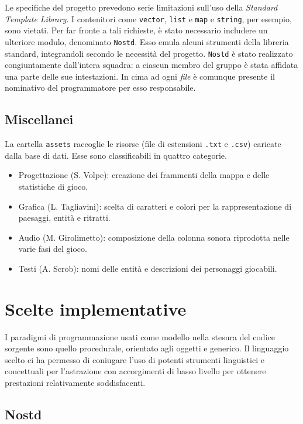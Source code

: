 \documentclass[a4paper]{article}
\begin{document}
Le specifiche del progetto prevedono serie limitazioni sull'uso della
\emph{Standard Template Library}. I contenitori come \verb!vector!, \verb!list!
e \verb!map! e \verb!string!, per esempio, sono vietati. Per far fronte a tali
richieste, \`e stato necessario includere un ulteriore modulo, denominato
\verb!Nostd!. Esso emula alcuni strumenti della libreria standard, integrandoli
secondo le necessit\`a del progetto. \verb!Nostd! \`e stato realizzato
congiuntamente dall'intera squadra: a ciascun membro del gruppo \`e stata
affidata una parte delle sue intestazioni. In cima ad ogni \emph{file} \`e
comunque presente il nominativo del programmatore per esso responsabile.

\subsection{Miscellanei}

La cartella \verb!assets! raccoglie le risorse (file di estensioni \verb!.txt! e
\verb!.csv!) caricate dalla base di dati.
Esse sono classificabili in quattro categorie.

\begin{itemize}
  \item Progettazione (S. Volpe): creazione dei frammenti della mappa e delle
    statistiche di gioco.
  \item Grafica (L. Tagliavini): scelta di caratteri e colori per la
    rappresentazione di paesaggi, entit\`a e ritratti.
  \item Audio (M. Girolimetto): composizione della colonna sonora riprodotta
    nelle varie fasi del gioco.
  \item Testi (A. Scrob): nomi delle entit\`a e descrizioni dei personaggi
    giocabili.
\end{itemize}

\section{Scelte implementative}

I paradigmi di programmazione usati come modello nella stesura del codice
sorgente sono quello procedurale, orientato agli oggetti e generico. Il
linguaggio scelto ci ha permesso di coniugare l'uso di potenti strumenti
linguistici e concettuali per l'astrazione con accorgimenti di basso livello
per ottenere prestazioni relativamente soddisfacenti.

\subsection{Nostd}
\end{document}

